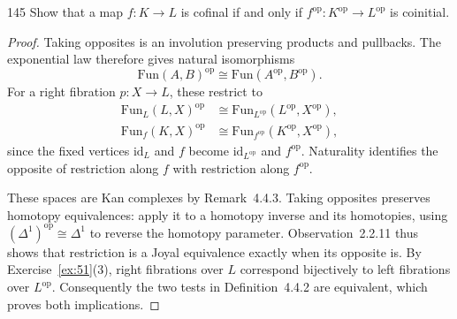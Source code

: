 \begin{exercise}{145}
Show that a map $f\colon K\to L$ is cofinal if and only if $f^{\mathrm{op}}\colon K^{\mathrm{op}}\to L^{\mathrm{op}}$ is
coinitial.

\begin{proof}
Taking opposites is an involution preserving products and pullbacks.
The exponential law therefore gives natural isomorphisms
\[
 \mathrm{Fun}(A,B)^{\mathrm{op}}
 \cong\mathrm{Fun}(A^{\mathrm{op}},B^{\mathrm{op}}).
\]
For a right fibration $p\colon X\to L$, these restrict to
\[
 \begin{aligned}
 \mathrm{Fun}_L(L,X)^{\mathrm{op}}
   &\cong\mathrm{Fun}_{L^{\mathrm{op}}}
       (L^{\mathrm{op}},X^{\mathrm{op}}),\\
 \mathrm{Fun}_f(K,X)^{\mathrm{op}}
   &\cong\mathrm{Fun}_{f^{\mathrm{op}}}
       (K^{\mathrm{op}},X^{\mathrm{op}}),
 \end{aligned}
\]
since the fixed vertices $\mathrm{id}_L$ and $f$ become
$\mathrm{id}_{L^{\mathrm{op}}}$ and $f^{\mathrm{op}}$.
Naturality identifies the opposite of restriction along $f$ with
restriction along $f^{\mathrm{op}}$.

These spaces are Kan complexes by Remark~4.4.3.
Taking opposites preserves homotopy equivalences: apply it to a
homotopy inverse and its homotopies, using
$(\Delta^1)^{\mathrm{op}}\cong\Delta^1$ to reverse the homotopy parameter.
Observation~2.2.11 thus shows that restriction is a Joyal equivalence
exactly when its opposite is.
By Exercise~\ref{ex:51}(3), right fibrations over $L$ correspond
bijectively to left fibrations over $L^{\mathrm{op}}$.
Consequently the two tests in Definition~4.4.2 are equivalent,
which proves both implications.
\end{proof}
\end{exercise}
